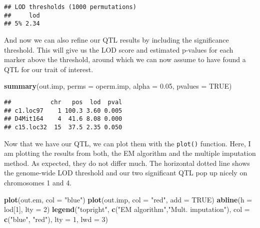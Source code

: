 \documentclass[12pt,]{krantz}
\newenvironment{Shaded}{\begin{snugshade}}{\end{snugshade}}
\newcommand{\KeywordTok}[1]{\textcolor[rgb]{0.27,0.27,0.27}{\textbf{#1}}}
\newcommand{\DataTypeTok}[1]{\textcolor[rgb]{0.27,0.27,0.27}{#1}}
\newcommand{\DecValTok}[1]{\textcolor[rgb]{0.06,0.06,0.06}{#1}}
\newcommand{\FloatTok}[1]{\textcolor[rgb]{0.06,0.06,0.06}{#1}}
\newcommand{\StringTok}[1]{\textcolor[rgb]{0.5,0.5,0.5}{#1}}
\newcommand{\OtherTok}[1]{\textcolor[rgb]{0.56,0.35,0.01}{#1}}
\newcommand{\NormalTok}[1]{#1}
\theoremstyle{definition}
\theoremstyle{definition}
\theoremstyle{definition}
\theoremstyle{remark}
\begin{document}
\begin{verbatim}
## LOD thresholds (1000 permutations)
##     lod
## 5% 2.34
\end{verbatim}

And now we can also refine our QTL results by including the significance
threshold. This will give us the LOD score and estimated p-values for
each marker above the threshold, around which we can now assume to have
found a QTL for our trait of interest.

\begin{Shaded}
\begin{Highlighting}[]
\KeywordTok{summary}\NormalTok{(out.imp, }\DataTypeTok{perms =}\NormalTok{ operm.imp, }\DataTypeTok{alpha =} \FloatTok{0.05}\NormalTok{, }\DataTypeTok{pvalues =} \OtherTok{TRUE}\NormalTok{)}
\end{Highlighting}
\end{Shaded}

\begin{verbatim}
##           chr   pos  lod  pval
## c1.loc97    1 100.3 3.60 0.005
## D4Mit164    4  41.6 8.08 0.000
## c15.loc32  15  37.5 2.35 0.050
\end{verbatim}

Now that we have our QTL, we can plot them with the \texttt{plot()}
function. Here, I am plotting the results from both, the EM algorithm
and the multiple imputation method. As expected, they do not differ
much. The horizontal dotted line shows the genome-wide LOD threshold and
our two significant QTL pop up nicely on chromosomes 1 and 4.

\begin{Shaded}
\begin{Highlighting}[]
\KeywordTok{plot}\NormalTok{(out.em, }\DataTypeTok{col =} \StringTok{"blue"}\NormalTok{)}
\KeywordTok{plot}\NormalTok{(out.imp, }\DataTypeTok{col =} \StringTok{"red"}\NormalTok{, }\DataTypeTok{add =} \OtherTok{TRUE}\NormalTok{)}
\KeywordTok{abline}\NormalTok{(}\DataTypeTok{h =}\NormalTok{ lod[}\DecValTok{1}\NormalTok{], }\DataTypeTok{lty =} \DecValTok{2}\NormalTok{)}
\KeywordTok{legend}\NormalTok{(}\StringTok{"topright"}\NormalTok{, }\KeywordTok{c}\NormalTok{(}\StringTok{"EM algorithm"}\NormalTok{,}\StringTok{"Mult. imputation"}\NormalTok{), }
       \DataTypeTok{col =} \KeywordTok{c}\NormalTok{(}\StringTok{"blue"}\NormalTok{, }\StringTok{"red"}\NormalTok{), }\DataTypeTok{lty =} \DecValTok{1}\NormalTok{, }\DataTypeTok{lwd =} \DecValTok{3}\NormalTok{)}
\end{Highlighting}
\end{Shaded}
\end{document}
